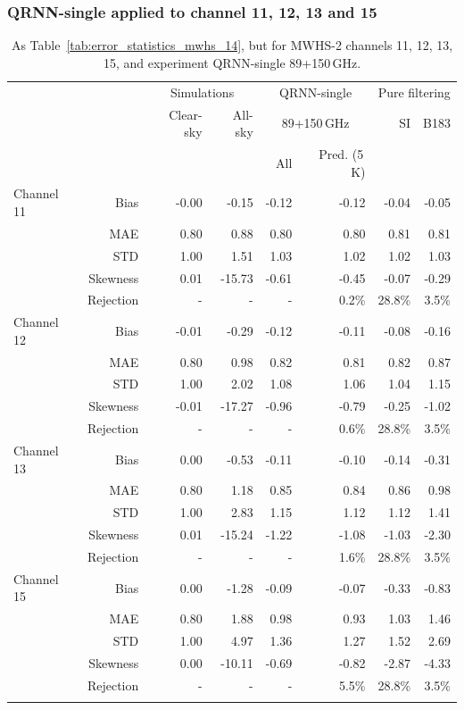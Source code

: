 \documentclass[amt, manuscript]{copernicus}
\begin{document}
\subsubsection{QRNN-single applied to channel 11, 12, 13 and 15}
\label{sec:mwhs_others}
\begin{table}[t]
	\caption{ As Table~\ref{tab:error_statistics_mwhs_14}, but for MWHS-2 channels 11, 12, 13, 15, and experiment QRNN-single 89+150\,GHz.}
	\label{tab:error_statistics_mwhs_others}
	\begin{tabular}{lrrr|rr|rr}
		\tophline
		&&\multicolumn{2}{c|}{Simulations}& \multicolumn{2}{c|}{QRNN-single} & \multicolumn{2}{c}{Pure filtering} \\
		\cline{2-8}
		& &  Clear-sky &   All-sky &  \multicolumn{2}{c|}{89+150\,GHz}    & SI & B183  \\
		&	&		   &			& All & Pred. (5\,K) &&\\
		\middlehline
		Channel 11  & Bias     & -0.00 &  -0.15 & -0.12 & -0.12 & -0.04 & -0.05\\
					& MAE      &  0.80 &   0.88 &  0.80 &  0.80 &  0.81 & 0.81 \\
					& STD      &  1.00 &   1.51 &  1.03 &  1.02 &  1.02 & 1.03 \\
					& Skewness &  0.01 & -15.73 & -0.61 & -0.45 & -0.07 & -0.29\\
					& Rejection   & -    & -      & -	  & 0.2\% & 28.8\% & 3.5\%  \\
		\middlehline
		Channel 12  &  Bias     & -0.01 &  -0.29 & -0.12 & -0.11  & -0.08 & -0.16\\
					&  MAE      &  0.80 &   0.98 &  0.82 &  0.81  &  0.82 & 0.87\\
					&  STD      &  1.00 &   2.02 &  1.08 &  1.06  &  1.04 & 1.15\\
					&  Skewness & -0.01 & -17.27 & -0.96 & -0.79  &  -0.25 & -1.02 \\
					& Rejection & -     & -      & -	 & 0.6\%  & 28.8\% & 3.5\%  \\
		\middlehline
		Channel 13  &Bias       & 0.00 &  -0.53 & -0.11 & -0.10 & -0.14 & -0.31\\
					&MAE        & 0.80 &   1.18 &  0.85 &  0.84 &  0.86 & 0.98\\
					&STD        & 1.00 &   2.83 &  1.15 &  1.12 &  1.12 & 1.41 \\
					&Skewness   & 0.01 & -15.24 & -1.22 & -1.08 & -1.03 & -2.30\\  	
					& Rejection & -     & -      & -	 & 1.6\%& 28.8\% & 3.5\%  \\	
		\middlehline
		Channel 15  &  Bias     & 0.00 &  -1.28 & -0.09 & -0.07 & -0.33 & -0.83\\
					&  MAE      & 0.80 &   1.88 &  0.98 &  0.93 &  1.03 &  1.46\\
					&  STD      & 1.00 &   4.97 &  1.36 &  1.27 &  1.52 &  2.69\\
					&  Skewness & 0.00 & -10.11 & -0.69 & -0.82 & -2.87 &  -4.33 \\ 
					& Rejection & -     & -      & -	 & 5.5\% & 28.8\%& 3.5\%  \\
		\bottomhline
	\end{tabular}
\end{table}
\end{document}
